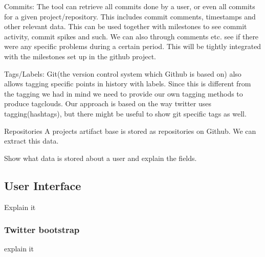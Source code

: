 Commits:
The tool can retrieve all commits done by a user, or even all commits for a given project/repository. This includes commit comments, timestamps and other relevant data. This can be used together with milestones to see commit activity, commit spikes and such. We can also through comments etc. see if there were any specific problems during a certain period. This will be tightly integrated with the milestones set up in the github project. 

Tags/Labels:
Git(the version control system which Github is based on) also allows tagging specific points in history with labels. Since this is different from the tagging we had in mind we need to provide our own tagging methods to produce tagclouds. Our approach is based on the way twitter uses tagging(hashtags), but there might be useful to show git specific tags as well.

Repositories
A projects artifact base is stored as repositories on Github. We can extract this data.

Show what data is stored about a user and explain the fields.

\subsection{User Interface}
Explain it
\subsubsection{Twitter bootstrap}
explain it
